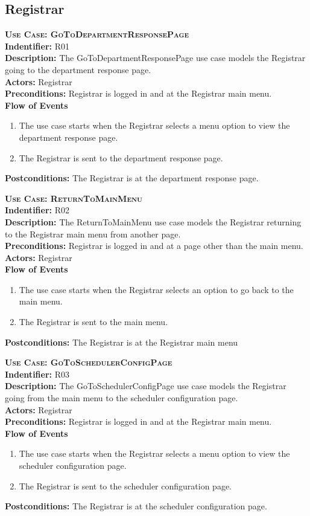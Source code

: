 \documentclass[11pt]{article}
\newenvironment{usecase}{%
	\def\title##1{ {\large \bfseries  \scshape {Use Case:} ##1} \\ }
 	\def\id##1{{\bf Indentifier:} ##1\\}
	\def\des##1{ {\bf Description:} ##1\\}
	\def\actors##1{ {\bf Actors:} ##1\\}
    	\def\pre##1{ {\bf Preconditions:} ##1 \\} %
    	\def\flow##1{ {\bf Flow of Events} ##1}%
    	\newenvironment{ucenum}{%
        	\begin{enumerate}[nolistsep]\small}%
        	{\end{enumerate}}
	\def\post##1{ {\bf Postconditions:} ##1 \\}
}{\vspace{.05in}}
\begin{document}
\subsection{Registrar}
\begin{usecase}
  \title{GoToDepartmentResponsePage}
  \id{R01}
  \des{The GoToDepartmentResponsePage use case models the Registrar going to the department response page.}
  \actors{Registrar}
  \pre{Registrar is logged in and at the Registrar main menu.}
  \flow{}
  \begin{ucenum}
  \item The use case starts when the Registrar selects a menu option to view the department response page.
  \item The Registrar is sent to the department response page.
  \end{ucenum}
  \post{The Registrar is at the department response page.}
\end{usecase}

\begin{usecase}
  \title{ReturnToMainMenu}
  \id{R02}
  \des{The ReturnToMainMenu use case models the Registrar returning to the Registrar main menu from another page.}
  \pre{Registrar is logged in and at a page other than the main menu.}
  \actors{Registrar}
  \flow{}
  \begin{ucenum}
  \item The use case starts when the Registrar selects an option to go back to the main menu.
  \item The Registrar is sent to the main menu.
  \end{ucenum}
  \post{The Registrar is at the Registrar main menu}
\end{usecase}

\begin{usecase}
  \title{GoToSchedulerConfigPage}
  \id{R03}
  \des{The GoToSchedulerConfigPage use case models the Registrar going from the main menu to the scheduler configuration page.}
  \actors{Registrar}
  \pre{Registrar is logged in and at the Registrar main menu.}
  \flow{}
  \begin{ucenum}
  \item The use case starts when the Registrar selects a menu option to view the scheduler configuration page.
  \item The Registrar is sent to the scheduler configuration page.
  \end{ucenum}
  \post{The Registrar is at the scheduler configuration page.}
\end{usecase}
\end{document}
